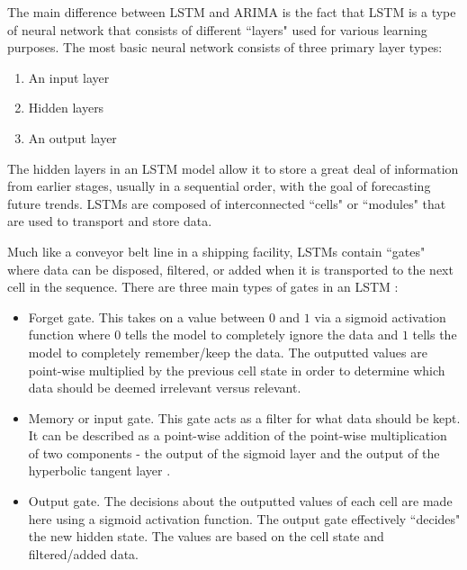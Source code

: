 \documentclass[twoside,11pt]{article}
\begin{document}
The main difference between LSTM and ARIMA is the fact that LSTM is a type of neural network that consists of different ``layers" used for various learning purposes. The most basic neural network consists of three primary layer types:
\begin{enumerate}
    \item An input layer
    \item Hidden layers
    \item An output layer
\end{enumerate}

The hidden layers in an LSTM model allow it to store a great deal of information from earlier stages, usually in a sequential order, with the goal of forecasting future trends. LSTMs are composed of interconnected ``cells" or ``modules" that are used to transport and store data.

Much like a conveyor belt line in a shipping facility, LSTMs contain ``gates" where data can be disposed, filtered, or added when it is transported to the next cell in the sequence. There are three main types of gates in an LSTM \citep{siami-namini:2018}:

\begin{itemize}
    \item Forget gate. This takes on a value between $0$ and $1$ via a sigmoid activation function where $0$ tells the model to completely ignore the data and $1$ tells the model to completely remember/keep the data. The outputted values are point-wise multiplied by the previous cell state in order to determine which data should be deemed irrelevant versus relevant.
    \item Memory or input gate. This gate acts as a filter for what data should be kept. It can be described as a point-wise addition of the point-wise multiplication of two components - the output of the sigmoid layer and the output of the hyperbolic tangent layer \citep{dolphin}.
    \item Output gate. The decisions about the outputted values of each cell are made here using a sigmoid activation function. The output gate effectively ``decides" the new hidden state. The values are based on the cell state and filtered/added data.
\end{itemize}
\end{document}
